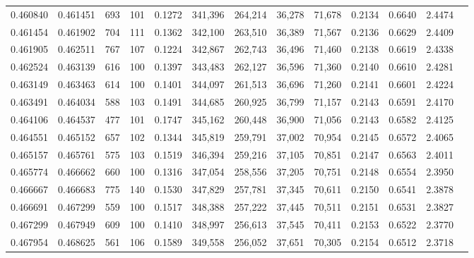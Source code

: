 \begin{tabular}{rrrrrrrrrrrrr}
0.460840 & 0.461451 &    693 &   101 &                                     0.1272 & 341,396 & 264,214 &  36,278 &  71,678 & 0.2134 & 0.6640 & 2.4474 \\
0.461454 & 0.461902 &    704 &   111 &                                     0.1362 & 342,100 & 263,510 &  36,389 &  71,567 & 0.2136 & 0.6629 & 2.4409 \\
0.461905 & 0.462511 &    767 &   107 &                                     0.1224 & 342,867 & 262,743 &  36,496 &  71,460 & 0.2138 & 0.6619 & 2.4338 \\
0.462524 & 0.463139 &    616 &   100 &                                     0.1397 & 343,483 & 262,127 &  36,596 &  71,360 & 0.2140 & 0.6610 & 2.4281 \\
0.463149 & 0.463463 &    614 &   100 &                                     0.1401 & 344,097 & 261,513 &  36,696 &  71,260 & 0.2141 & 0.6601 & 2.4224 \\
0.463491 & 0.464034 &    588 &   103 &                                     0.1491 & 344,685 & 260,925 &  36,799 &  71,157 & 0.2143 & 0.6591 & 2.4170 \\
0.464106 & 0.464537 &    477 &   101 &                                     0.1747 & 345,162 & 260,448 &  36,900 &  71,056 & 0.2143 & 0.6582 & 2.4125 \\
0.464551 & 0.465152 &    657 &   102 &                                     0.1344 & 345,819 & 259,791 &  37,002 &  70,954 & 0.2145 & 0.6572 & 2.4065 \\
0.465157 & 0.465761 &    575 &   103 &                                     0.1519 & 346,394 & 259,216 &  37,105 &  70,851 & 0.2147 & 0.6563 & 2.4011 \\
0.465774 & 0.466662 &    660 &   100 &                                     0.1316 & 347,054 & 258,556 &  37,205 &  70,751 & 0.2148 & 0.6554 & 2.3950 \\
0.466667 & 0.466683 &    775 &   140 &                                     0.1530 & 347,829 & 257,781 &  37,345 &  70,611 & 0.2150 & 0.6541 & 2.3878 \\
0.466691 & 0.467299 &    559 &   100 &                                     0.1517 & 348,388 & 257,222 &  37,445 &  70,511 & 0.2151 & 0.6531 & 2.3827 \\
0.467299 & 0.467949 &    609 &   100 &                                     0.1410 & 348,997 & 256,613 &  37,545 &  70,411 & 0.2153 & 0.6522 & 2.3770 \\
0.467954 & 0.468625 &    561 &   106 &                                     0.1589 & 349,558 & 256,052 &  37,651 &  70,305 & 0.2154 & 0.6512 & 2.3718 \\

\end{tabular}
